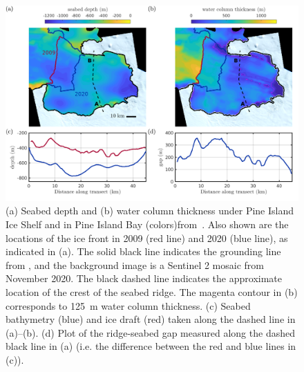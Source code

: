 \documentclass[draft]{agujournal2019}
\begin{document}
\begin{figure}
    \centering
    \includegraphics[width = \textwidth]{../make_figures/plots/figure1_withColumnThickness.pdf}
    \caption{(a) Seabed depth and (b) water column thickness under Pine Island Ice Shelf and in Pine Island Bay (colors)from~. Also shown are the locations of the ice front in 2009 (red line) and 2020 (blue line), as indicated in (a).  The solid black line indicates the grounding line from , and the background image is a Sentinel 2 mosaic from November 2020. The black dashed line indicates the approximate location of the crest of the seabed ridge. The magenta contour in (b) corresponds to 125~m  water column thickness. (c) Seabed bathymetry (blue) and ice draft (red) taken along the dashed line in (a)--(b). (d) Plot of the ridge-seabed gap measured along the dashed black line in (a) (i.e. the difference between the red and blue lines in (c)). }
    \label{fig:figure1}
\end{figure}
\end{document}
